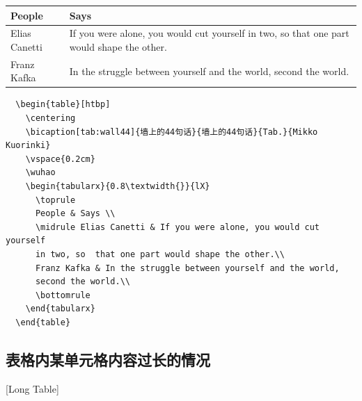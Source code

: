 \begin{table}[htbp]
  \centering
  \vspace{0.2cm}
  \wuhao
  \begin{tabularx}{0.8\textwidth{}}{lX}
    \toprule
    People        & Says                                                 \\
    \midrule
    Elias Canetti & If you were alone, you would cut yourself in two, so
    that one part would shape the other.                                 \\
    Franz Kafka   & In the struggle between yourself and the world,
    second the world.                                                    \\
    \bottomrule
  \end{tabularx}
\end{table}

\begin{lstlisting}
  \begin{table}[htbp]
    \centering
    \bicaption[tab:wall44]{墙上的44句话}{墙上的44句话}{Tab.}{Mikko Kuorinki}
    \vspace{0.2cm}
    \wuhao
    \begin{tabularx}{0.8\textwidth{}}{lX}
      \toprule
      People & Says \\
      \midrule Elias Canetti & If you were alone, you would cut yourself
      in two, so  that one part would shape the other.\\
      Franz Kafka & In the struggle between yourself and the world,
      second the world.\\
      \bottomrule
    \end{tabularx}
  \end{table}
\end{lstlisting}

\subsection{表格内某单元格内容过长的情况}[Long Table]

